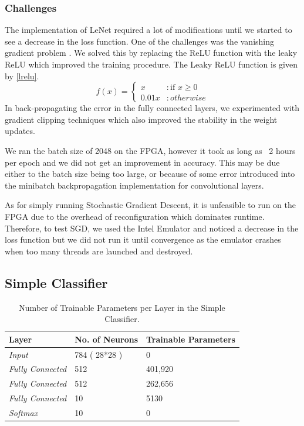 \subsubsection{Challenges}

The implementation of LeNet required a lot of modifications until we started to see a decrease in the loss function. One of the challenges was the vanishing gradient problem \cite{hochreiter1998vanishing}. We solved this by replacing the ReLU function with the leaky ReLU which improved the training procedure. The Leaky ReLU function is given by \ref{lrelu}.
 \begin{equation}
  f(x) = \left\{
  \begin{array}{lr}
    x & : \textrm{if } x \ge 0 \\
    0.01x & : otherwise
  \end{array}
\right.
\label{lrelu}
 \end{equation}
 In back-propagating the error in the fully connected layers, we experimented with gradient clipping techniques which also improved the stability in the weight updates. 

We ran the batch size of 2048 on the FPGA, however it took as long as  ~2 hours per epoch and we did not get an improvement in accuracy. This may be due either to the batch size being too large, or because of some error introduced into the minibatch backpropagation implementation for convolutional layers. 

As for simply running Stochastic Gradient Descent,  it is unfeasible to run on the FPGA due to the overhead of reconfiguration which dominates runtime. Therefore, to test SGD, we used the Intel Emulator and noticed a decrease in the loss function but we did not run it until convergence as the emulator crashes when too many threads are launched and destroyed. 

\subsection{Simple Classifier}

\begin{table}[]
\centering
\begin{tabular}{|l|l|l|}
\hline
\textbf{Layer}           & \textbf{No. of Neurons} & \textbf{Trainable Parameters} \\ \hline
\textit{Input}           & 784 ( 28*28 )           & 0                             \\ \hline
\textit{Fully Connected} & 512                     & 401,920                       \\ \hline
\textit{Fully Connected} & 512                     & 262,656                       \\ \hline
\textit{Fully Connected} & 10                      & 5130                          \\ \hline
\textit{Softmax}         & 10                      & 0                             \\ \hline
\end{tabular}
\caption{Number of Trainable Parameters per Layer in the Simple Classifier.}
\label{tab:simplemod}
\end{table}

